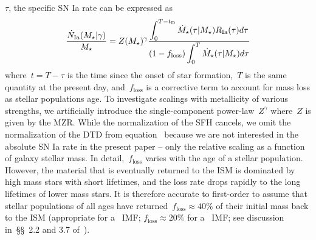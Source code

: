 \documentclass[ms.tex]{subfiles}
\begin{document}
$\tau$, the specific SN Ia rate can be expressed as
\begin{equation}
\frac{\dot{N}_\text{Ia}(M_\star | \gamma)}{M_\star} = Z(M_\star)^\gamma
\frac{\displaystyle{
	\int_0^{T - t_\text{D}}\dot{M}_\star(\tau | M_\star) R_\text{Ia}(\tau) d\tau
}}{\displaystyle{
	(1 - f_\text{loss})\int_0^T \dot{M}_\star(\tau | M_\star) d\tau
}}
\label{eq:specia}
\end{equation}
where~$t = T - \tau$ is the time since the onset of star formation,~$T$ is the
same quantity at the present day, and~$f_\text{loss}$ is a corrective term to
account for mass loss as stellar populations age.
To investigate scalings with metallicity of various strengths, we artificially
introduce the single-component power-law~$Z^\gamma$ where~$Z$ is given by the
MZR.
While the normalization of the SFH cancels, we omit the normalization of the
DTD from equation~ because we are not interested in the
absolute SN Ia rate in the present paper -- only the relative scaling as a
function of galaxy stellar mass.
In detail,~$f_\text{loss}$ varies with the age of a stellar population.
However, the material that is eventually returned to the ISM is dominated by
high mass stars with short lifetimes, and the loss rate drops rapidly to the
long lifetimes of lower mass stars.
It is therefore accurate to first-order to assume that stellar populations of
all ages have returned~$f_\text{loss} \approx 40\%$ of their initial mass back
to the ISM (appropriate for a~\citealt{Kroupa2001} IMF;
$f_\text{loss} \approx 20\%$ for a~\citealt{Salpeter1955} IMF; see discussion
in~\S\S~2.2 and 3.7 of~\citealt*{Weinberg2017}).
\end{document}
